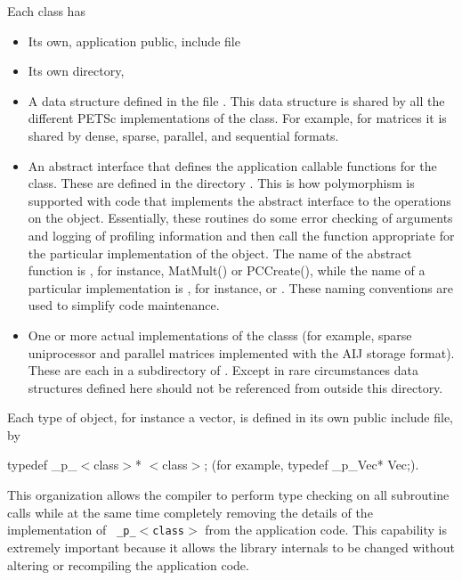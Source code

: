\documentclass[twoside,12pt]{../sty/report_petsc}
\begin{document}
Each class has
\begin{itemize}
\item Its own, application public, include file 
\item Its own directory, 
\item A data structure defined in  the file
      .
      This data structure is shared by all the different PETSc implementations of the
      class. For example, for matrices it is shared by dense,
      sparse, parallel, and sequential formats.
\item An abstract interface that defines the application callable
      functions for the class. These are defined in the directory
      . This is how polymorphism is supported with code that implements the abstract interface to the
operations on the object.  Essentially, these routines do some error
checking of arguments and logging of profiling information
and then call the function appropriate for the
particular implementation of the object. The name of the abstract
function is , for instance, MatMult() or PCCreate(), while
the name of a particular implementation is
, for instance,
 or . These naming
conventions are used to simplify code maintenance.

\item One or more actual implementations of the classs (for example,
      sparse uniprocessor and parallel matrices implemented with the AIJ storage format).
      These are each in a subdirectory of
      . Except in rare
      circumstances data
      structures defined here should not be referenced from outside this
      directory.
\end{itemize}

Each type of object, for instance a vector, is defined in its own
public include file, by
\begin{tabbing}
   typedef \_p\_$<$class$>$* $<$class$>$; (for example, typedef \_p\_Vec* Vec;).
\end{tabbing}
  This organization
allows the compiler to perform type checking on all subroutine calls
while at the same time
completely removing the details of the implementation of {\tt
\_p\_$<$class$>$} from the application code.  This capability is extremely important
because it allows the library internals to be changed
without altering or recompiling the application code.
\end{document}
